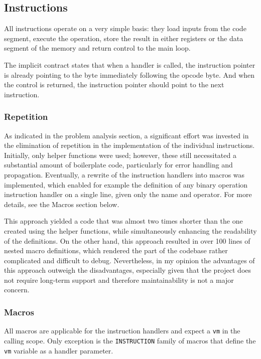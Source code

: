 \documentclass[12pt,a4paper]{paper}
\newcommand{\code}[1]{\texttt{#1}}
\begin{document}
\subsection{Instructions}

All instructions operate on a very simple basis: they load inputs from the code
segment, execute the operation, store the result in either registers or the data
segment of the memory and return control to the main loop. 

The implicit contract states that when a handler is called, the instruction
pointer is already pointing to the byte immediately following the opcode byte.
And when the control is returned, the instruction pointer should point to the
next instruction.

\subsubsection{Repetition}

As indicated in the problem analysis section, a significant effort was invested
in the elimination of repetition in the implementation of the individual
instructions. Initially, only helper functions were used; however, these still
necessitated a substantial amount of boilerplate code, particularly for error
handling and propagation. Eventually, a rewrite of the instruction handlers into
macros was implemented, which enabled for example the definition of any binary
operation instruction handler on a single line, given only the name and
operator. For more details, see the Macros section below.

This approach yielded a code that was almost two times shorter than the one
created using the helper functions, while simultaneously enhancing the
readability of the definitions. On the other hand, this approach resulted in
over 100 lines of nested macro definitions, which rendered the part of the
codebase rather complicated and difficult to debug. Nevertheless, in my opinion
the advantages of this approach outweigh the disadvantages, especially given
that the project does not require long-term support and therefore
maintainability is not a major concern.

\subsubsection{Macros}

All macros are applicable for the instruction handlers and expect a \code{vm}
in the calling scope. Only exception is the \code{INSTRUCTION} family of macros
that define the \code{vm} variable as a handler parameter.
\end{document}
